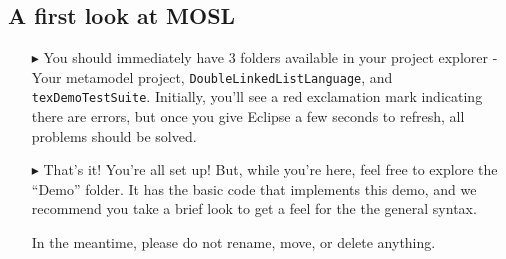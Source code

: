 \newpage
\texHeader

\subsection{A first look at MOSL}

\begin{itemize}
\FloatBarrier
\hypertarget{simpleDemo tex}{} 
\item[$\blacktriangleright$] You should immediately have 3 folders available in your project explorer - Your metamodel project,
\texttt{DoubleLinkedListLanguage}, and \\ \texttt{texDemoTestSuite}. Initially, you'll see a red exclamation mark indicating there are errors, but once you give
Eclipse a few seconds to refresh, all problems should be solved.

\item[$\blacktriangleright$] That's it! You're all set up! But, while you're here, feel free to explore the ``Demo'' folder. It has the basic code that implements
this demo, and we recommend you take a brief look to get a feel for the the general syntax.

In the meantime, please do not rename, move, or delete anything.
\end{itemize}